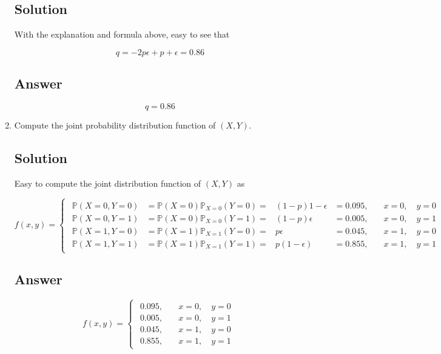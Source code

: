 \documentclass[12pt]{article}
\newcommand{\bP}{\mathbb{P}}
\begin{document}
\begin{enumerate}[start=1,label={\bfseries Part \arabic*:},leftmargin=0in]
		\subsection*{Solution}
		
			With the explanation and formula above, easy to see that
		
			\[q = -2p\epsilon + p + \epsilon = 0.86\]
		
		\subsection*{Answer}
		
			\[\boxed{q = 0.86}\]
			
		\bigskip\item Compute the joint probability distribution function of $(X,Y)$.
		
		\subsection*{Solution}
		
			Easy to compute the joint distribution function of $(X,Y)$ as
			
			\[
				f(x,y) =
					\begin{cases}
						\begin{aligned}
							\bP(X=0,Y=0) &= \bP(X=0)\bP_{X = 0}(Y = 0) = &(1-p)1 - \epsilon &= 0.095,&\quad x = 0,\quad y = 0\\
							\bP(X=0,Y=1) &= \bP(X=0)\bP_{X = 0}(Y = 1) = &(1-p)\epsilon &= 0.005,&\quad x = 0,\quad y = 1\\
							\bP(X=1,Y=0) &= \bP(X=1)\bP_{X = 1}(Y = 0) = &p\epsilon &= 0.045,&\quad x = 1,\quad y = 0\\
							\bP(X=1,Y=1) &= \bP(X=1)\bP_{X = 1}(Y = 1) = &p(1 - \epsilon) &= 0.855,&\quad x = 1,\quad y = 1
						\end{aligned}
					\end{cases}
			\]
		
		\subsection*{Answer}
		
			\[\boxed{f(x,y) =
				\begin{cases}
					\begin{aligned}
						0.095,&\quad x = 0,\quad y = 0\\
						0.005,&\quad x = 0,\quad y = 1\\
						0.045,&\quad x = 1,\quad y = 0\\
						0.855,&\quad x = 1,\quad y = 1
					\end{aligned}
			\end{cases}}\]
	\end{enumerate}
	
\end{document}
